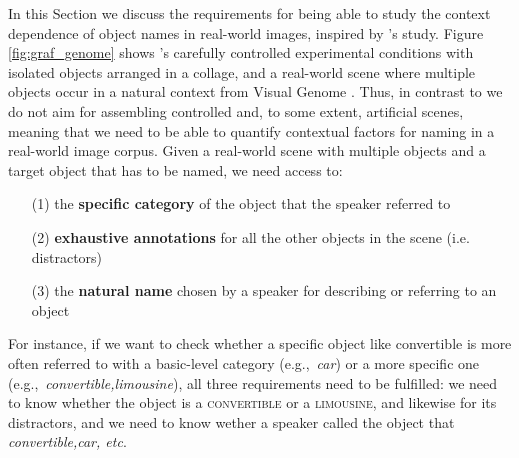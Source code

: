 \documentclass[runningheads]{llncs}
\newcommand{\refexp}[1]{\textsl{#1}}
\newcommand{\cat}[1]{\textsc{#1}}
\begin{document}
In this Section we discuss the requirements for  being able to study the context dependence of object names in real-world images, inspired by \cite{graf2016animal}'s study.
 Figure \ref{fig:graf_genome} shows  \cite{graf2016animal}'s carefully controlled experimental conditions with isolated objects arranged in a collage, and a real-world scene where multiple objects occur in a natural context from Visual Genome \cite{krishna2016visualgenome}.
Thus, in contrast to \cite{graf2016animal} we do not aim for assembling controlled and, to some extent, artificial scenes, meaning that we need to be able to quantify contextual factors for naming in a real-world image corpus. 
Given a real-world scene with multiple objects and a target object that has to be named, we need access to:

\begin{itemize}
    
		\item[(1)] the \textbf{specific category} of the object that the speaker referred to 
		\item[(2)] \textbf{exhaustive annotations} for all the other objects in the scene (i.e. distractors)
		\item[(3)] the \textbf{natural name} chosen by a speaker for describing or referring to an object

\end{itemize}

For instance, if we want to check whether a specific object like convertible is more often referred to with a basic-level category (e.g.,~\refexp{car}) or a more specific one (e.g.,~\refexp{convertible,limousine}), all three requirements need to be fulfilled: we need to know whether the object is a \cat{convertible} or  a \cat{limousine}, and likewise for its distractors, and we need to know wether a speaker called the object that \refexp{convertible,car, etc}.
\end{document}
